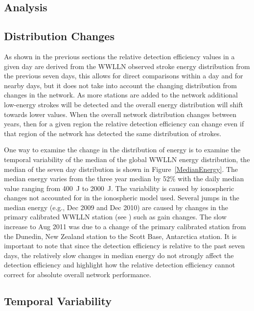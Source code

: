 \documentclass[draft,ras]{agutex}
\begin{document}
\begin{article}
\section{Analysis}

\subsection{Distribution Changes}

As shown in the previous sections the relative detection efficiency values in a given day are derived from the WWLLN observed stroke energy distribution from the previous seven days, this allows for direct comparisons within a day and for nearby days, but it does not take into account the changing distribution from changes in the network. As more stations are added to the network additional low-energy strokes will be detected and the overall energy distribution will shift towards lower values. When the overall network distribution changes between years, then for a given region the relative detection efficiency can change even if that region of the network has detected the same distribution of strokes. 

One way to examine the change in the distribution of energy is to examine the temporal variability of the median of the global WWLLN energy distribution, the median of the seven day distribution is shown in Figure~\ref{MedianEnergy}. The median energy varies from the three year median by 52\% with the daily median value ranging from 400~J to 2000~J. The variability is caused by ionospheric changes not accounted for in the ionospheric model used. Several jumps in the median energy (e.g., Dec 2009 and Dec 2010) are caused by changes in the primary calibrated WWLLN station (see \citet{Hutchins2012}) such as gain changes. The slow increase to Aug 2011 was due to a change of the primary calibrated station from the Dunedin, New Zealand station to the Scott Base, Antarctica station. It is important to note that since the detection efficiency is relative to the past seven days, the relatively slow changes in median energy do not strongly affect the detection efficiency and highlight how the relative detection efficiency cannot correct for absolute overall network performance.

\subsection{Temporal Variability}


\end{article}
\end{document}
